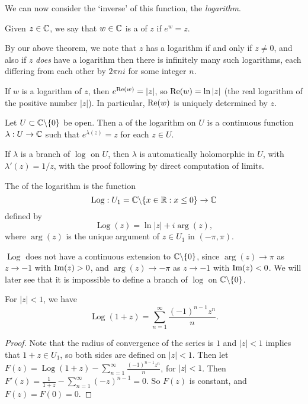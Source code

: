 \documentclass[a4paper]{scrartcl}
\begin{document}
We can now consider the `inverse' of this function, the \emph{logarithm}.

\begin{definition}[Logarithm]
    Given $z \in \mathbb{C}$, we say that $w \in \mathbb{C}$ is a  of $z$ if $e^w = z$.
\end{definition}

By our above theorem, we note that $z$ has a logarithm if and only if $z \neq 0$, and also if $z$ \emph{does} have a logarithm then there is infinitely many such logarithms, each differing from each other by $2 \pi n i$ for some integer $n$.

If $w$ is a logarithm of $z$, then $e^{\operatorname{Re}(w)} = |z|$, so $\operatorname{Re}(w) = \ln |z|$ (the real logarithm of the positive number $|z|$). In particular, $\operatorname{Re}(w)$ is uniquely determined by $z$.

\begin{definition}
    Let $U \subset \mathbb{C} \backslash \{0\}$ be open. Then a  of the logarithm on $U$ is a continuous function $\lambda : U \rightarrow \mathbb{C}$ such that $e^{\lambda(z)} = z$ for each $z \in U$.
\end{definition}

\begin{remark}
    If $\lambda$ is a branch of $\log$ on $U$, then $\lambda$ is automatically holomorphic in $U$, with $\lambda'(z) = 1/z$, with the proof following by direct computation of limits.
\end{remark}

\begin{definition}
The  of the logarithm is the function
$$
\operatorname{Log}: U_1 = \mathbb{C} \backslash \{x \in \mathbb{R} : x \leq 0\} \rightarrow \mathbb{C}
$$
defined by
$$
\operatorname{Log}(z) = \ln|z| + i \arg(z),
$$
where $\arg(z)$ is the unique argument of $z \in U_1$ in $(-\pi, \pi)$.
\end{definition}

\begin{remark}
    $\operatorname{Log}$ does not have a continuous extension to $\mathbb{C} \backslash \{0\}$, since $\arg(z) \rightarrow \pi$ as $z \rightarrow -1$ with $\operatorname{Im}(z) > 0$, and $\arg(z) \rightarrow -\pi$ as $z \rightarrow -1$ with $\operatorname{Im} (z) < 0$. We will later see that it is impossible to define a branch of $\log$ on $\mathbb{C} \backslash \{0\}$.
\end{remark}

\begin{proposition}
    For $|z| < 1$, we have
    $$
    \operatorname{Log}(1 + z)=\sum_{n=1}^{\infty} \frac{(-1)^{n-1} z^{n}}{n}.
    $$
\end{proposition}
\begin{proof}
    Note that the radius of convergence of the series is $1$ and $|z| < 1$ implies that $1 + z \in U_1$, so both sides are defined on $|z| < 1$. Then let $F(z) = \operatorname{Log}(1 + z) - \sum_{n=1}^{\infty} \frac{(-1)^{n-1} z^{n}}{n}$, for $|z| < 1$. Then $F'(z) = \frac{1}{1 + z} - \sum_{n = 1}^{\infty} (-z)^{n - 1} = 0$. So $F(z)$ is constant, and $F(z) = F(0) = 0$.
\end{proof}
\end{document}
